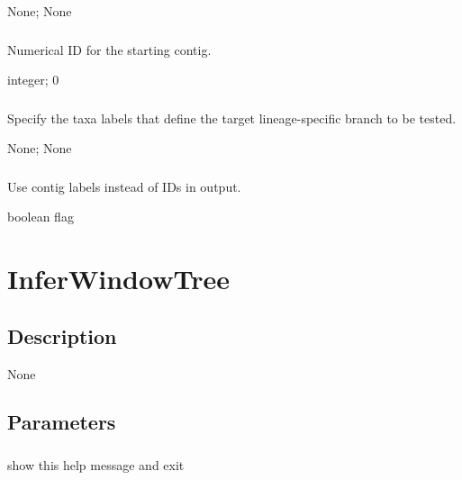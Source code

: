 \documentclass[letterpaper,11pt,english]{sphinxmanual}
\begin{document}
 None;  None


\subsubsection{}
\label{\detokenize{prog_desc:start-contig-startcontig}}
 Numerical ID for the starting contig.

 integer;  0


\subsubsection{}
\label{\detokenize{prog_desc:target}}
 Specify the taxa labels that define the target lineage-specific branch to be tested.

 None;  None


\subsubsection{}
\label{\detokenize{prog_desc:uselabels-use-labels}}
 Use contig labels instead of IDs in output.

 boolean flag


\section{InferWindowTree}
\label{\detokenize{prog_desc:inferwindowtree}}

\subsection{Description}
\label{\detokenize{prog_desc:id99}}
None


\subsection{Parameters}
\label{\detokenize{prog_desc:id100}}

\subsubsection{}
\label{\detokenize{prog_desc:id101}}
 show this help message and exit
\end{document}

